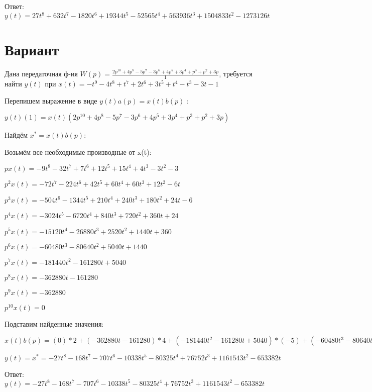 \documentclass{article}
\begin{document}
{Ответ: $y(t) = 27t^{8}+632t^{7}-1820t^{6}+19344t^{5}-52565t^{4}+563936t^{3}+1504833t^{2}-1273126t$

\section{Вариант}

Дана передаточная ф-ия $W(p)=\frac{2p^{10}+4p^{8}-5p^{7}-3p^{6}+4p^{5}+3p^{4}+p^{3}+p^{2}+3p}{1}$, требуется найти $y(t)$ при $x(t)=-t^{9}-4t^{8}+t^{7}+2t^{6}+3t^{5}+t^{4}-t^{3}-3t-1$

Перепишем выражение в виде $y(t)a(p)=x(t)b(p)$ :

$y(t)(1)=x(t)(2p^{10}+4p^{8}-5p^{7}-3p^{6}+4p^{5}+3p^{4}+p^{3}+p^{2}+3p)$

Найдём $x^*=x(t)b(p)$:

Возьмём все необходимые производные от x(t):

$px(t)=-9t^{8}-32t^{7}+7t^{6}+12t^{5}+15t^{4}+4t^{3}-3t^{2}-3$

$p^2x(t)=-72t^{7}-224t^{6}+42t^{5}+60t^{4}+60t^{3}+12t^{2}-6t$

$p^3x(t)=-504t^{6}-1344t^{5}+210t^{4}+240t^{3}+180t^{2}+24t-6$

$p^4x(t)=-3024t^{5}-6720t^{4}+840t^{3}+720t^{2}+360t+24$

$p^5x(t)=-15120t^{4}-26880t^{3}+2520t^{2}+1440t+360$

$p^6x(t)=-60480t^{3}-80640t^{2}+5040t+1440$

$p^7x(t)=-181440t^{2}-161280t+5040$

$p^8x(t)=-362880t-161280$

$p^9x(t)=-362880$

$p^10x(t)=0$

Подставим найденные значения:

$x(t)b(p) = (0)*2+(-362880t-161280)*4+(-181440t^{2}-161280t+5040)*(-5)+(-60480t^{3}-80640t^{2}+5040t+1440)*(-3)+(-15120t^{4}-26880t^{3}+2520t^{2}+1440t+360)*4+(-3024t^{5}-6720t^{4}+840t^{3}+720t^{2}+360t+24)*3+(-504t^{6}-1344t^{5}+210t^{4}+240t^{3}+180t^{2}+24t-6)*1+(-72t^{7}-224t^{6}+42t^{5}+60t^{4}+60t^{3}+12t^{2}-6t)*1+(-9t^{8}-32t^{7}+7t^{6}+12t^{5}+15t^{4}+4t^{3}-3t^{2}-3)*3+=-27t^{8}-168t^{7}-707t^{6}-10338t^{5}-80325t^{4}+76752t^{3}+1161543t^{2}-653382t$





$y(t)=x^*=-27t^{8}-168t^{7}-707t^{6}-10338t^{5}-80325t^{4}+76752t^{3}+1161543t^{2}-653382t$

Ответ: $y(t) = -27t^{8}-168t^{7}-707t^{6}-10338t^{5}-80325t^{4}+76752t^{3}+1161543t^{2}-653382t$

}
\end{document}
